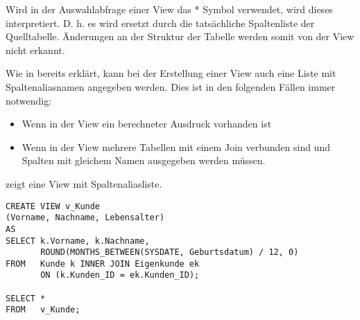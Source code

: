         \begin{merke}
          Wird in der Auswahlabfrage einer View das * Symbol verwendet, wird dieses interpretiert. D. h. es wird ersetzt durch die tatsächliche Spaltenliste der Quelltabelle. Änderungen an der Struktur der Tabelle werden somit von der View nicht erkannt.
        \end{merke}
        Wie in  bereits erklärt, kann bei der Erstellung einer View auch eine Liste mit Spaltenaliasnamen angegeben werden. Dies ist in den folgenden Fällen immer notwendig:
        \begin{itemize}
          \item Wenn in der View ein berechneter Ausdruck vorhanden ist
          \item Wenn in der View mehrere Tabellen mit einem Join verbunden sind und Spalten mit gleichem Namen ausgegeben werden müssen.
        \end{itemize}
		\clearpage
         zeigt eine View mit Spaltenaliasliste.
        \begin{lstlisting}[language=oracle_sql,caption={Eine einfache View mit Spaltenaliasliste},label=sql08_29]
CREATE VIEW v_Kunde
(Vorname, Nachname, Lebensalter)
AS
SELECT k.Vorname, k.Nachname,
       ROUND(MONTHS_BETWEEN(SYSDATE, Geburtsdatum) / 12, 0)
FROM   Kunde k INNER JOIN Eigenkunde ek
       ON (k.Kunden_ID = ek.Kunden_ID);

SELECT *
FROM   v_Kunde;
        \end{lstlisting}
